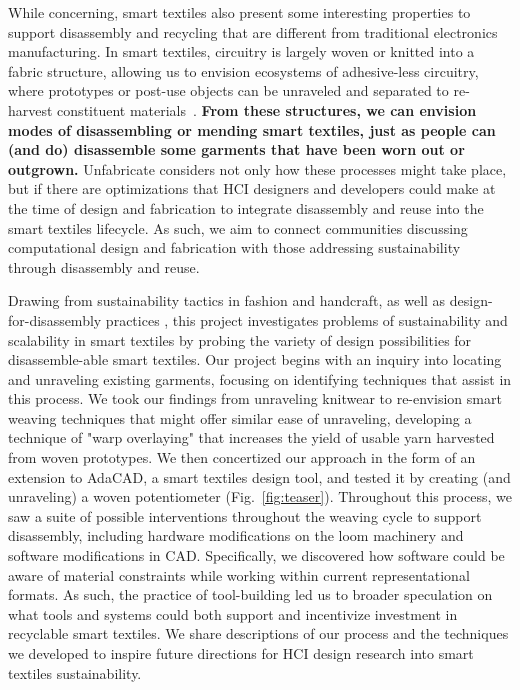 While concerning, smart textiles also present some interesting properties to support disassembly and recycling that are different from traditional electronics manufacturing. In smart textiles, circuitry is largely woven or knitted into a fabric structure, allowing us to envision ecosystems of adhesive-less circuitry, where prototypes or post-use objects can be unraveled and separated to re-harvest constituent materials~\cite{zysset_weaving_2010}. \textbf{From these structures, we can envision modes of disassembling or mending smart textiles, just as people can (and do) disassemble some garments that have been worn out or outgrown.} Unfabricate considers not only how these processes might take place, but if there are optimizations that HCI designers and developers could make at the time of design and fabrication to integrate disassembly and reuse into the smart textiles lifecycle. As such, we aim to connect communities discussing computational design and fabrication with those addressing sustainability through disassembly and reuse.

Drawing from sustainability tactics in fashion and handcraft, as well as design-for-disassembly practices \cite{webster_dfd,circular_disassembly}, this project investigates problems of sustainability and scalability in smart textiles by probing the variety of design possibilities for disassemble-able smart textiles. Our project begins with an inquiry into locating and unraveling existing garments, focusing on identifying techniques that assist in this process. We took our findings from unraveling knitwear to re-envision smart weaving techniques that might offer similar ease of unraveling, developing a technique of "warp overlaying" that increases the yield of usable yarn harvested from woven prototypes. We then concertized our approach in the form of an extension to AdaCAD, a smart textiles design tool, and tested it by creating (and unraveling) a woven potentiometer (Fig.~\ref{fig:teaser}). Throughout this process, we saw a suite of possible interventions throughout the weaving cycle to support disassembly, including hardware modifications on the loom machinery and software modifications in CAD. Specifically, we discovered how software could be aware of material constraints while working within current representational formats. As such, the practice of tool-building led us to broader speculation on what tools and systems could both support and incentivize investment in recyclable smart textiles. We share descriptions of our process and the techniques we developed to inspire future directions for HCI design research into smart textiles sustainability.
 

